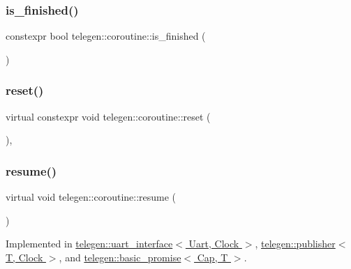 \subsubsection{\texorpdfstring{is\+\_\+finished()}{is\_finished()}}
{\footnotesize\ttfamily constexpr bool telegen\+::coroutine\+::is\+\_\+finished (\begin{DoxyParamCaption}{ }\end{DoxyParamCaption})\hspace{0.3cm}{\ttfamily [inline]}}

\mbox{\label{structtelegen_1_1coroutine_a345d1cc0fd5bd8d126022958d4f17d3b}} 
\subsubsection{\texorpdfstring{reset()}{reset()}}
{\footnotesize\ttfamily virtual constexpr void telegen\+::coroutine\+::reset (\begin{DoxyParamCaption}{ }\end{DoxyParamCaption})\hspace{0.3cm}{\ttfamily [inline]}, {\ttfamily [virtual]}}

\mbox{\label{structtelegen_1_1coroutine_a2a7408a5b9474af3e59128934e3a5c00}} 
\subsubsection{\texorpdfstring{resume()}{resume()}}
{\footnotesize\ttfamily virtual void telegen\+::coroutine\+::resume (\begin{DoxyParamCaption}{ }\end{DoxyParamCaption})\hspace{0.3cm}{\ttfamily [pure virtual]}}



Implemented in \hyperlink{classtelegen_1_1uart__interface_acc4f7dbff9e17b04a55ece5f447272df}{telegen\+::uart\+\_\+interface$<$ Uart, Clock $>$}, \hyperlink{classtelegen_1_1publisher_a143382f6ff9560be4839c50b3f1dc86c}{telegen\+::publisher$<$ T, Clock $>$}, and \hyperlink{classtelegen_1_1basic__promise_a384761b0c7536d6b9ab3dc0f63c7e259}{telegen\+::basic\+\_\+promise$<$ Cap, T $>$}.

